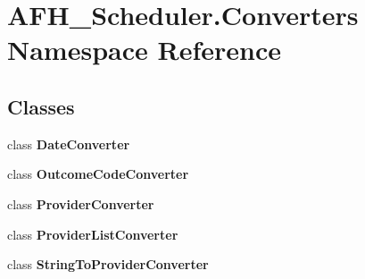 \section{A\+F\+H\+\_\+\+Scheduler.\+Converters Namespace Reference}
\label{namespace_a_f_h___scheduler_1_1_converters}
\subsection*{Classes}
\begin{DoxyCompactItemize}
\item 
class \textbf{ Date\+Converter}
\item 
class \textbf{ Outcome\+Code\+Converter}
\item 
class \textbf{ Provider\+Converter}
\item 
class \textbf{ Provider\+List\+Converter}
\item 
class \textbf{ String\+To\+Provider\+Converter}
\end{DoxyCompactItemize}
